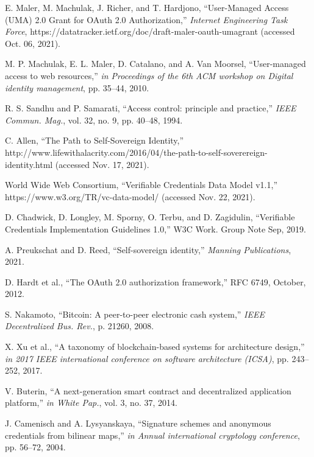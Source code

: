 \documentclass[conference]{IEEEtran}
\begin{document}
\begin{sloppypar}
\begin{thebibliography}{00}
    E. Maler, M. Machulak, J. Richer, and T. Hardjono, ``User-Managed Access (UMA) 2.0 Grant for OAuth 2.0 Authorization,'' {\em Internet Engineering Task Force}, https://datatracker.ietf.org/doc/draft-maler-oauth-umagrant (accessed Oct. 06, 2021).
  
    M. P. Machulak, E. L. Maler, D. Catalano, and A. Van Moorsel, ``User-managed access to web resources,'' {\em in Proceedings of the 6th ACM workshop on Digital identity management}, pp. 35–44, 2010.
  
    R. S. Sandhu and P. Samarati, ``Access control: principle and practice,'' {\em IEEE Commun. Mag.}, vol. 32, no. 9, pp. 40–48, 1994.
  
    C. Allen, ``The Path to Self-Sovereign Identity,'' http://www.lifewithalacrity.com/2016/04/the-path-to-self-soverereign-identity.html (accessed Nov. 17, 2021).
  
    World Wide Web Consortium, ``Verifiable Credentials Data Model v1.1,'' https://www.w3.org/TR/vc-data-model/ (accessed Nov. 22, 2021).
  
    D. Chadwick, D. Longley, M. Sporny, O. Terbu, and D. Zagidulin, ``Verifiable Credentials Implementation Guidelines 1.0,'' W3C Work. Group Note Sep, 2019.
  
    A. Preukschat and D. Reed, ``Self-sovereign identity,'' {\em Manning Publications}, 2021.
  
    D. Hardt et al., ``The OAuth 2.0 authorization framework,'' RFC 6749, October, 2012.
  
    S. Nakamoto, ``Bitcoin: A peer-to-peer electronic cash system,'' {\em IEEE Decentralized Bus. Rev.}, p. 21260, 2008.
  
    X. Xu et al., ``A taxonomy of blockchain-based systems for architecture design,'' {\em in 2017 IEEE international conference on software architecture (ICSA)}, pp. 243–252, 2017.
  
    V. Buterin, ``A next-generation smart contract and decentralized application platform,'' {\em in White Pap.}, vol. 3, no. 37, 2014.
  
    J. Camenisch and A. Lysyanskaya, ``Signature schemes and anonymous credentials from bilinear maps,'' {\em in Annual international cryptology conference}, pp. 56–72, 2004.
  

\end{thebibliography}
\end{sloppypar}
\end{document}
